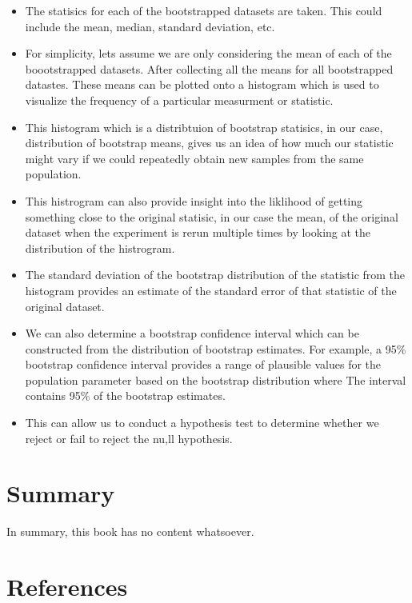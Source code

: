 \documentclass[
  letterpaper,
  DIV=11,
  numbers=noendperiod]{scrreprt}
\providecommand{\tightlist}{%
  \setlength{\itemsep}{0pt}\setlength{\parskip}{0pt}}
\begin{document}
\begin{itemize}
\tightlist
\item
  The statisics for each of the bootstrapped datasets are taken. This
  could include the mean, median, standard deviation, etc.
\item
  For simplicity, lets assume we are only considering the mean of each
  of the boootstrapped datasets. After collecting all the means for all
  bootstrapped datastes. These means can be plotted onto a histogram
  which is used to visualize the frequency of a particular measurment or
  statistic.
\item
  This histogram which is a distribtuion of bootstrap statisics, in our
  case, distribution of bootstrap means, gives us an idea of how much
  our statistic might vary if we could repeatedly obtain new samples
  from the same population.
\item
  This histrogram can also provide insight into the liklihood of getting
  something close to the original statisic, in our case the mean, of the
  original dataset when the experiment is rerun multiple times by
  looking at the distribution of the histrogram.
\item
  The standard deviation of the bootstrap distribution of the statistic
  from the histogram provides an estimate of the standard error of that
  statistic of the original dataset.
\item
  We can also determine a bootstrap confidence interval which can be
  constructed from the distribution of bootstrap estimates. For example,
  a 95\% bootstrap confidence interval provides a range of plausible
  values for the population parameter based on the bootstrap
  distribution where The interval contains 95\% of the bootstrap
  estimates.
\item
  This can allow us to conduct a hypothesis test to determine whether we
  reject or fail to reject the nu,ll hypothesis.
\end{itemize}


\chapter{Summary}\label{summary}

In summary, this book has no content whatsoever.


\chapter*{References}\label{references}
\end{document}
